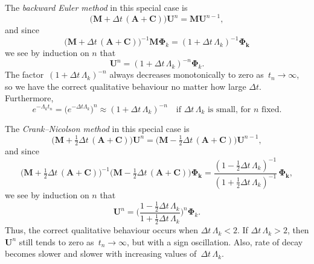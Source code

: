 \begin{example}
The \emph{backward Euler method} in this special case is
\[
\bigl(\boldsymbol{M}+\Delta t\,(\boldsymbol{A}+\boldsymbol{C})\bigr) 
    \boldsymbol{U}^n=\boldsymbol{M}\boldsymbol{U}^{n-1},
\]
and since
\[
\bigl(\boldsymbol{M} +\Delta t\,(\boldsymbol{A}+\boldsymbol{C})\bigr)^{-1}
\boldsymbol{M}\boldsymbol{\Phi}_k
    =(1+\Delta t\,\Lambda_k)^{-1}\boldsymbol{\Phi_k}
\]
we see by induction on $n$ that
\[
\boldsymbol{U}^n=(1+\Delta t\,\Lambda_k)^{-n}\boldsymbol{\Phi}_k.
\]
The factor~$(1+\Delta t\,\Lambda_k)^{-n}$ always decreases monotonically to 
zero as~$t_n\to\infty$, so we have the correct qualitative behaviour no matter 
how large $\Delta t$.  Furthermore,
\[
e^{-\Lambda_kt_n}=\bigl(e^{-\Delta t\Lambda_k}\bigr)^n
    \approx(1+\Delta t\,\Lambda_k)^{-n}
    \quad\text{if $\Delta t\,\Lambda_k$ is small, for $n$ fixed.}
\]
\end{example}

\begin{example}
The \emph{Crank--Nicolson method} in this special case is
\[
\bigl(\boldsymbol{M}+\tfrac12\Delta t\,(\boldsymbol{A}+\boldsymbol{C})\bigr) 
    \boldsymbol{U}^n
=\bigl(\boldsymbol{M}-\tfrac12\Delta t\,(\boldsymbol{A}+\boldsymbol{C})\bigr) 
    \boldsymbol{U}^{n-1},
\]
and since
\[
\bigl(\boldsymbol{M}+\tfrac12\Delta t\,
    (\boldsymbol{A}+\boldsymbol{C})\bigr)^{-1}
\bigl(\boldsymbol{M}-\tfrac12\Delta t\,(\boldsymbol{A}+\boldsymbol{C})\bigr) 
    \boldsymbol{\Phi_k}
    =\frac{(1-\tfrac12\Delta t\,\Lambda_k)^{-1}}%
{(1+\tfrac12\Delta t\,\Lambda_k)^{-1}}\,\boldsymbol{\Phi_k},
\]
we see by induction on $n$ that
\[
\boldsymbol{U}^n=\biggl(
    \frac{1-\tfrac12\Delta t\,\Lambda_k}{1+\tfrac12\Delta t\,\Lambda_k}\biggr)^n
    \boldsymbol{\Phi}_k.
\]
Thus, the correct qualitative behaviour occurs when $\Delta t\,\Lambda_k<2$.
If $\Delta t\,\Lambda_k>2$, then $\boldsymbol{U}^n$ still tends to zero 
as~$t_n\to\infty$, but with a sign oscillation.  Also, rate of decay becomes 
slower and slower with increasing values of~$\Delta t\,\Lambda_k$.
\end{example}

